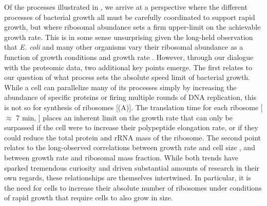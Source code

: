Of the processes illustrated in , we arrive at a
perspective where the different processes of bacterial growth all must be carefully
coordinated to support rapid growth, but where ribosomal abundance sets a firm
upper-limit on the achievable growth rate. This is in some sense
unsurprising given the long-held observation that \textit{E. coli} and many
other organisms vary their ribosomal abundance as a function of growth
conditions and growth rate \citep{scott2010, metzlraz2017}. However, through our
dialogue with the proteomic data, two additional key points emerge. The first
relates to our question of what process sets the absolute speed limit of
bacterial growth. While a cell can parallelize many of its processes simply by
increasing the abundance of specific proteins or firing multiple rounds of DNA
replication, this is not so for synthesis of ribosomes
[(A)]. The translation time for each ribosome [$\approx$ 7
min, \cite{dill2011}] places an inherent limit on the growth rate that can only
be surpassed if the cell were to increase their polypeptide elongation rate, or
if they could reduce the total protein and rRNA mass of the ribosome. The second
point relates to the long-observed correlations between growth rate and cell
size \citep{schaechter1958, si2017}, and between growth rate and ribosomal mass
fraction. While both trends have sparked tremendous curiosity and driven
substantial amounts of research in their own regards, these relationships are
themselves intertwined. In particular, it is the need for cells to increase
their absolute number of ribosomes under conditions of rapid growth that require
cells to also grow in size.

